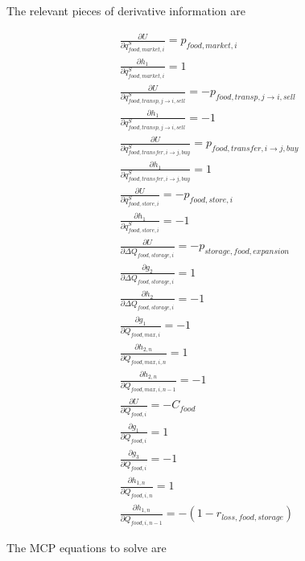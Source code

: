 \documentclass[letter,12pt]{article}
\begin{document}
The relevant pieces of derivative information are

\begin{gather}
\frac{\partial U}{\partial q_{food,market,i}^S} = p_{food,market,i} \\
\frac{\partial h_1}{\partial q_{food,market,i}^S} = 1 \\
\frac{\partial U}{\partial q_{food,transp,j \rightarrow i,sell}^S} = - p_{food,transp,j \rightarrow i,sell} \\
\frac{\partial h_1}{\partial q_{food,transp,j \rightarrow i,sell}^S} = -1 \\
\frac{\partial U}{\partial q_{food,transfer,i \rightarrow j,buy}^S} = p_{food,transfer,i \rightarrow j,buy} \\
\frac{\partial h_1}{\partial q_{food,transfer,i \rightarrow j,buy}^S} = 1 \\
\frac{\partial U}{\partial q_{food,store,i}^S} = - p_{food,store,i} \\
\frac{\partial h_1}{\partial q_{food,store,i}^S} = -1 \\
\frac{\partial U}{\partial \Delta Q_{food,storage,i}} = -p_{storage,food,expansion} \\
\frac{\partial g_2}{\partial \Delta Q_{food,storage,i}} = 1 \\
\frac{\partial h_2}{\partial \Delta Q_{food,storage,i}} = -1 \\
\frac{\partial g_1}{\partial Q_{food,max,i}} = -1 \\
\frac{\partial h_{2,n}}{\partial Q_{food,max,i,n}} = 1 \\
\frac{\partial h_{2,n}}{\partial Q_{food,max,i,n-1}} = -1 \\
\frac{\partial U}{\partial Q_{food,i}} = -C_{food} \\
\frac{\partial g_1}{\partial Q_{food,i}} = 1 \\
\frac{\partial g_3}{\partial Q_{food,i}} = -1 \\
\frac{\partial h_{1,n}}{\partial Q_{food,i,n}} = 1 \\
\frac{\partial h_{1,n}}{\partial Q_{food,i,n-1}} = - \left(1-r_{loss,food,storage}\right)
\end{gather}

The MCP equations to solve are
\end{document}
